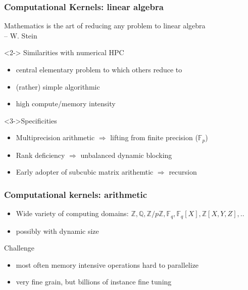 \documentclass{beamer}
\newcommand{\Z}{\ensuremath{\mathbb{Z}\xspace}}
\newcommand{\Q}{\ensuremath{\mathbb{Q}\xspace}}
\newcommand{\F}{\ensuremath{\mathbb{F}\xspace}}
\newcommand{\thus}{\textcolor{red}{\MVRightarrow{}}\xspace}
\begin{document}
  \begin{frame}
  \frametitle{Computational Kernels: linear algebra}
  \begin{displayquote}
    Mathematics is the art of reducing any problem to linear algebra\\
    \hfill{-- W. Stein}
  \end{displayquote}

  \begin{block}<2-> {Similarities with numerical HPC}
    \begin{itemize}
    \item central elementary problem to which others reduce to
    \item (rather) simple algorithmic
    \item high compute/memory intensity
    \end{itemize}
  \end{block}
    \begin{block}<3->{Specificities}
      \begin{itemize}
      \item Multiprecision arithmetic $\Rightarrow$ lifting from finite  precision ($\mathbb{F}_p$)
      \item Rank deficiency $\Rightarrow$ unbalanced dynamic blocking
      \item Early adopter of subcubic matrix arithemtic $\Rightarrow$ recursion
      \end{itemize}
    \end{block}

  \end{frame}
  
  \begin{frame}
    \frametitle{Computational kernels: arithmetic}

    \begin{itemize}
    \item Wide variety of computing domains: $\Z,\Q,\Z/p\Z,\F_q, \F_q[X], \Z[X,Y,Z],..$
    \item possibly with dynamic size
    \end{itemize}

    \begin{block}{Challenge}
      \begin{itemize}
      \item most often memory intensive operations \thus hard to parallelize
      \item very fine grain, but billions of instance \thus fine tuning
      \end{itemize}
    \end{block}
  \end{frame}
  
\end{document}
